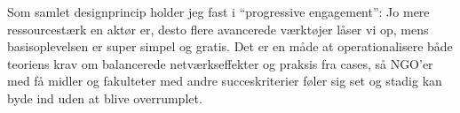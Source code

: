 Som samlet designprincip holder jeg fast i ``progressive engagement'': Jo mere ressourcestærk en aktør er, desto flere avancerede værktøjer låser vi op, mens basisoplevelsen er super simpel og gratis. Det er en måde at operationalisere både teoriens krav om balancerede netværkseffekter og praksis fra cases, så NGO'er med få midler og fakulteter med andre succeskriterier føler sig set og stadig kan byde ind uden at blive overrumplet.
